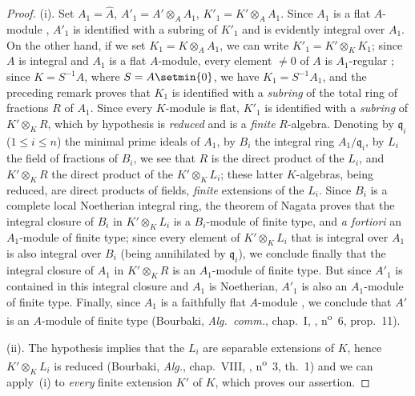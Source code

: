 \begin{proof}
\medskip\noindent
(i).
Set $A_1=\hat{A}$, $A'_1=A'\otimes_A A_1$, $K'_1=K'\otimes_A A_1$.
Since $A_1$ is a flat $A$-module , $A'_1$ is identified with a subring of $K'_1$ and is evidently integral over $A_1$.
On the other hand, if we set $K_1=K\otimes_A A_1$, we can write $K'_1=K'\otimes_K K_1$; since $A$ is integral and $A_1$ is a flat $A$-module, every element $\neq 0$ of $A$ is $A_1$-regular ; since $K=S^{-1}A$, where $S=A\setmin\{0\}$, we have $K_1=S^{-1}A_1$, and the preceding remark proves that $K_1$ is identified with a \emph{subring} of the total ring of fractions $R$ of $A_1$.
Since every $K$-module is flat, $K'_1$ is identified with a \emph{subring} of $K'\otimes_K R$, which by hypothesis is \emph{reduced} and is a \emph{finite} $R$-algebra.
Denoting by $\mathfrak{q}_i$ ($1\leq i\leq n$) the minimal prime ideals of $A_1$, by $B_i$ the integral ring $A_1/\mathfrak{q}_i$, by $L_i$ the field of fractions of $B_i$, we see that $R$ is the direct product of the $L_i$, and $K'\otimes_K R$ the direct product of the $K'\otimes_K L_i$; these latter $K$-algebras, being reduced, are direct products of fields, \emph{finite} extensions of the $L_i$.
Since $B_i$ is a complete local Noetherian integral ring, the theorem of Nagata  proves that the integral closure of $B_i$ in $K'\otimes_K L_i$ is a $B_i$-module of finite type, and \emph{a fortiori} an $A_1$-module of finite type; since every element of $K'\otimes_K L_i$ that is integral over $A_1$ is also integral over $B_i$ (being annihilated by $\mathfrak{q}_i$), we conclude finally that the integral closure of $A_1$ in $K'\otimes_K R$ is an $A_1$-module of finite type.
But since $A'_1$ is contained in this integral closure and $A_1$ is Noetherian, $A'_1$ is also an $A_1$-module of finite type.
Finally, since $A_1$ is a faithfully flat $A$-module , we conclude that $A'$ is an $A$-module of finite type (Bourbaki, \emph{Alg.~comm.}, chap.~I, , n\textsuperscript{o}~6, prop.~11).

\medskip\noindent
{}
(ii).
The hypothesis implies that the $L_i$ are separable extensions of $K$, hence $K'\otimes_K L_i$ is reduced (Bourbaki, \emph{Alg.}, chap.~VIII, , n\textsuperscript{o}~3, th.~1) and we can apply~(i) to \emph{every} finite extension $K'$ of $K$, which proves our assertion.
\end{proof}

